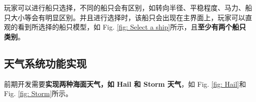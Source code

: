 \documentclass[letterpaper,10pt]{article}
\begin{document}
		玩家可以进行船只选择，不同的船只会有区别，如转向半径、平稳程度、马力、船只大小等会有明显区别。并且进行选择时，该船只会出现在主界面上，玩家可以直观的看到所选择的船只模型，如 Fig. \ref{fig: Select a ship}所示，且\textbf{至少有两个船只类别}。
				
		\subsection{天气系统功能实现}
				
		前期开发需要\textbf{实现两种海面天气，如 Hail 和 Storm 天气}，如 Fig. \ref{fig: Hail}和 Fig. \ref{fig: Storm}所示。
				
		\begin{figure}[htbp] 
		\centering 
					

\end{figure}
\end{document}
